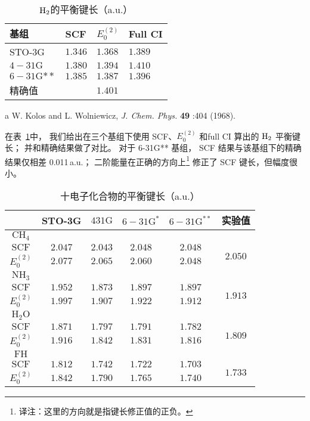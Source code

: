 \begin{table}[H]
	\centering
	\caption{$\mathrm{H}_2$的平衡键长（a.u.）}
	\begin{threeparttable}
		\begin{tabular}{llll}
			\hline 基组 & SCF & $E_0^{(2)}$ & Full CI \\
			\hline STO-3G & $1.346$ & $1.368$ & $1.389$ \\
			$4-31 \mathrm{G}$ & $1.380$ & $1.394$ & $1.410$ \\
			$6-31 \mathrm{G}{**}$ & $1.385$ & $1.387$ & $1.396$ \\
			\hline 精确值\tnote{a} & & $1.401$ & \\
			\hline
		\end{tabular}
		\begin{tablenotes}
			\item[a] W. Kolos and L. Wolniewicz, \textit{J. Chem. Phys.} \textbf{49} :404 (1968).
		\end{tablenotes}
	\end{threeparttable}
\label{tab:6.4}
\end{table}
在表~\ref{tab:6.4}中，
我们给出在三个基组下使用 SCF、$E_0^{(2)}$ 和full CI 算出的 $\mathrm{H}_2$ 平衡键长；
并和精确结果做了对比。 
对于 6-31G** 基组，
SCF 结果与该基组下的精确结果仅相差 0.011\,a.u.；
二阶能量在正确的方向上\footnote{译注：这里的方向就是指键长修正值的正负。}
修正了 SCF 键长，但幅度很小。

\begin{table}
	\centering
	\caption{十电子化合物的平衡键长（a.u.）}
	\begin{tabular}{cccccc}
		\hline & STO-3G & $431 \mathrm{G}$ & $6-31 \mathrm{G}^*$ & $6-31 \mathrm{G}^{* *}$ & 实验值 \\
		\hline
		$\mathrm{CH}_4$ & & & & & \\
		$\mathrm{SCF}$ & $2.047$ & $2.043$ & $2.048$ & $2.048$ & \multirow{2}{*}{$2.050$}\\
		$E_0^{(2)}$ & $2.077$ & $2.065$ & $2.060$ & $2.048$ & \\
		$\mathrm{NH}_3$ & & & & & \\
		$\mathrm{SCF}$ & $1.952$ & $1.873$ & $1.897$ & $1.897$ & \multirow{2}{*}{$1.913$}\\
		$E_0^{(2)}$ & $1.997$ & $1.907$ & $1.922$ & $1.912$ &  \\
		$\mathrm{H}_2 \mathrm{O}$ & & & & & \\
		$\mathrm{SCF}$ & $1.871$ & $1.797$ & $1.791$ & $1.782$ & \multirow{2}{*}{$1.809$}\\
		$E_0^{(2)}$ & $1.916$ & $1.842$ &  $1.831$ & $1.816$ & \\
		$\mathrm{FH}$ & & & & & \\ 
		$\mathrm{SCF}$ & $1.812$ & $1.742$ & $1.722$ & $1.703$ & \multirow{2}{*}{$1.733$}\\
		$E_0^{(2)}$ & $1.842$ & $1.790$ & $1.765$ & $1.740$ & \\ \hline
	\end{tabular}
	\label{tab:6.5}
\end{table}

